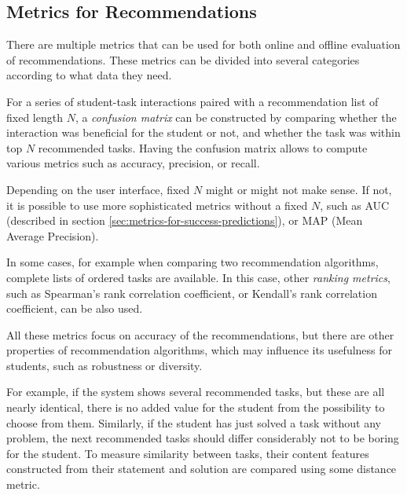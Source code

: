 

\subsection{Metrics for Recommendations}
\label{sec:metrics-for-recommendation}

There are multiple metrics that can be used for both online and offline
evaluation of recommendations.
These metrics can be divided into several categories
according to what data they need.

For a series of student-task interactions paired with a recommendation list of
fixed length $N$, a \emph{confusion matrix} can be constructed by comparing
whether the interaction was beneficial for the student or not,
and whether the task was within top $N$ recommended tasks.
Having the confusion matrix allows to compute various metrics such as
accuracy, precision, or recall. %

Depending on the user interface, fixed $N$ might or might not make sense.
If not, it is possible to use more sophisticated metrics without a fixed $N$,
such as AUC (described in section \ref{sec:metrics-for-success-predictions}),
or MAP (Mean Average Precision).

In some cases, for example when comparing two recommendation algorithms,
complete lists of ordered tasks are available.
In this case, other \emph{ranking metrics},
  such as Spearman's rank correlation coefficient,
  or Kendall's rank correlation coefficient,
  can be also used.

All these metrics focus on accuracy of the recommendations,
but there are other properties of recommendation algorithms,
which may influence its usefulness for students,
such as robustness or diversity.

For example, if the system shows several recommended tasks,
but these are all nearly identical, there is no added value
for the student from the possibility to choose from them.
Similarly, if the student has just solved a task
without any problem, the next recommended tasks should
differ considerably not to be boring for the student.
To measure similarity between tasks, their content features
constructed from their statement and solution are compared
using some distance metric.


